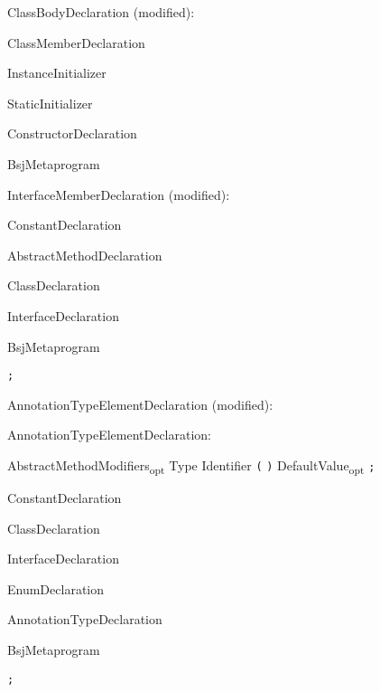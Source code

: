 \documentclass[a4paper,10pt]{report}
\newcommand{\opt}{\textsubscript{opt}}
\newenvironment{grammar}{
    \begin{list}{}{
        \itshape
        \setlength{\partopsep}{\topsep}
        \setlength{\topsep}{0cm}
    }
}{
    \end{list}
}
\begin{document}
\begin{grammar}
    \item ClassBodyDeclaration (modified):
    \begin{grammar}
        \item ClassMemberDeclaration
        \item InstanceInitializer
        \item StaticInitializer
        \item ConstructorDeclaration
        \item BsjMetaprogram
    \end{grammar}
\end{grammar}

\begin{grammar}
    \item InterfaceMemberDeclaration (modified):
    \begin{grammar}
        \item ConstantDeclaration
        \item AbstractMethodDeclaration
        \item ClassDeclaration
        \item InterfaceDeclaration
        \item BsjMetaprogram
        \item \verb`;`
    \end{grammar}
\end{grammar}

\begin{grammar}
    \item AnnotationTypeElementDeclaration (modified):
    \begin{grammar}
        \item AnnotationTypeElementDeclaration:
        \item AbstractMethodModifiers\opt{} Type Identifier \verb`(` \verb`)` DefaultValue\opt{} \verb`;`
        \item ConstantDeclaration
        \item ClassDeclaration
        \item InterfaceDeclaration
        \item EnumDeclaration
        \item AnnotationTypeDeclaration
        \item BsjMetaprogram
        \item \verb`;`
    \end{grammar}
\end{grammar}
\end{document}
